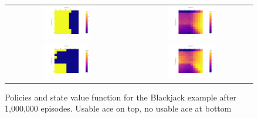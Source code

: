 \begin{figure}
\centering

\begin{tabular}{cc}
\includegraphics[width=0.4\textwidth]{rl_into/blackjack_es/blackjack_pi_iteration_1000000_ace1.png} &
\includegraphics[width=0.4\textwidth]{rl_into/blackjack_es/blackjack_v_iteration_1000000_ace1.png} \\
\includegraphics[width=0.4\textwidth]{rl_into/blackjack_es/blackjack_pi_iteration_1000000_ace0.png} &
\includegraphics[width=0.4\textwidth]{rl_into/blackjack_es/blackjack_v_iteration_1000000_ace0.png}
\end{tabular}
\caption[Policies and state value function for the Blackjack example]{Policies and state value function for the Blackjack example after 1,000,000 episodes. Usable ace on top, no usable ace at bottom}
\label{fig:blackjack}
\end{figure}


